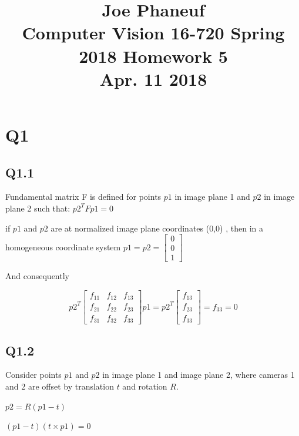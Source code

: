 \documentclass[12pt]{article}
\begin{document}
\title{Joe Phaneuf \\ Computer Vision 16-720 Spring 2018 Homework 5 \\ Apr. 11 2018 }
\date{}
\author{}
\maketitle

\newpage


\section{Q1}
\subsection{Q1.1}
Fundamental matrix F is defined for points $p1$ in image plane 1 and $p2$ in image plane 2 such that:  
$p2^{T} F p1 = 0$  
  
if $p1$ and $p2$ are at normalized image plane coordinates (0,0) , then in a homogeneous coordinate system  
$ p1 = p2 = \begin{bmatrix} 0 \\ 0 \\ 1 \end{bmatrix}$   
  
And consequently  

$$
p2^{T}
\begin{bmatrix}
f_{11} & f_{12} & f_{13} \\
f_{21} & f_{22} & f_{23} \\
f_{31} & f_{32} & f_{33}
\end{bmatrix}
p1
=
p2^{T}
\begin{bmatrix}
f_{13} \\
f_{23} \\
f_{33}
\end{bmatrix}
=
f_{33}
=0
$$

\newpage
\subsection{Q1.2}
Consider points $p1$ and $p2$ in image plane 1 and image plane 2, where cameras 1 and 2 are offset by translation $t$ and rotation $R$.  
  
$p2 = R ( p1 - t)$  
  
$(p1 - t ) ( t \times p1 ) = 0$  
  
\end{document}
